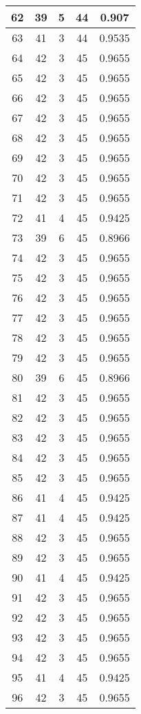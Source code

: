 \documentclass[letterpaper, 12pt]{article}
\begin{document}
\begin{longtable}{|c|c|c|c|c|}
\hline
62 & 39 & 5 & 44 & 0.907 \\
\hline
63 & 41 & 3 & 44 & 0.9535 \\
\hline
64 & 42 & 3 & 45 & 0.9655 \\
\hline
65 & 42 & 3 & 45 & 0.9655 \\
\hline
66 & 42 & 3 & 45 & 0.9655 \\
\hline
67 & 42 & 3 & 45 & 0.9655 \\
\hline
68 & 42 & 3 & 45 & 0.9655 \\
\hline
69 & 42 & 3 & 45 & 0.9655 \\
\hline
70 & 42 & 3 & 45 & 0.9655 \\
\hline
71 & 42 & 3 & 45 & 0.9655 \\
\hline
72 & 41 & 4 & 45 & 0.9425 \\
\hline
73 & 39 & 6 & 45 & 0.8966 \\
\hline
74 & 42 & 3 & 45 & 0.9655 \\
\hline
75 & 42 & 3 & 45 & 0.9655 \\
\hline
76 & 42 & 3 & 45 & 0.9655 \\
\hline
77 & 42 & 3 & 45 & 0.9655 \\
\hline
78 & 42 & 3 & 45 & 0.9655 \\
\hline
79 & 42 & 3 & 45 & 0.9655 \\
\hline
80 & 39 & 6 & 45 & 0.8966 \\
\hline
81 & 42 & 3 & 45 & 0.9655 \\
\hline
82 & 42 & 3 & 45 & 0.9655 \\
\hline
83 & 42 & 3 & 45 & 0.9655 \\
\hline
84 & 42 & 3 & 45 & 0.9655 \\
\hline
85 & 42 & 3 & 45 & 0.9655 \\
\hline
86 & 41 & 4 & 45 & 0.9425 \\
\hline
87 & 41 & 4 & 45 & 0.9425 \\
\hline
88 & 42 & 3 & 45 & 0.9655 \\
\hline
89 & 42 & 3 & 45 & 0.9655 \\
\hline
90 & 41 & 4 & 45 & 0.9425 \\
\hline
91 & 42 & 3 & 45 & 0.9655 \\
\hline
92 & 42 & 3 & 45 & 0.9655 \\
\hline
93 & 42 & 3 & 45 & 0.9655 \\
\hline
94 & 42 & 3 & 45 & 0.9655 \\
\hline
95 & 41 & 4 & 45 & 0.9425 \\
\hline
96 & 42 & 3 & 45 & 0.9655 \\

\end{longtable}
\end{document}

